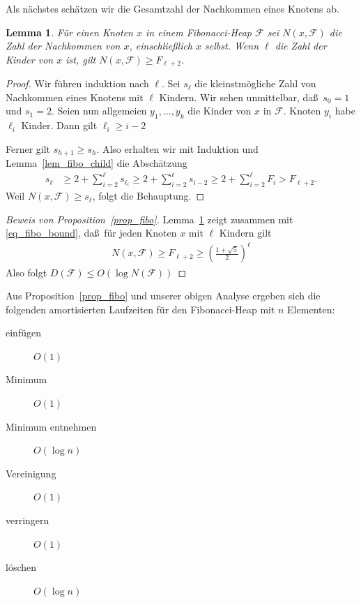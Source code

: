 \documentclass[10pt,reqno]{amsart}
\numberwithin{equation}{section}
\newcommand\cF{\mathcal F}
\newtheorem{lemma}[definition]{Lemma}
\newcommand\bc[1]{\left({#1}\right)}
\newcommand\bcfr[2]{\bc{\frac{#1}{#2}}}
\newcommand\Lem{Lemma}
\newcommand\Prop{Proposition}
\begin{document}
Als n\"achstes sch\"atzen wir die Gesamtzahl der Nachkommen eines Knotens ab.
				
		\begin{lemma}\label{lem_fibo_succ}
			F\"ur einen Knoten $x$ in einem Fibonacci-Heap $\cF$ sei $N(x,\cF)$ die Zahl der Nachkommen von $x$, einschlie\ss lich $x$ selbst. Wenn $\ell$ die Zahl der Kinder von $x$ ist, gilt $ N(x,\cF)\geq F_{\ell+2} $.
		\end{lemma}
		\begin{proof}
				Wir f\"uhren induktion nach $\ell$.
				Sei $s_\ell$ die kleinstm\"ogliche Zahl von Nachkommen eines Knotens mit $\ell$ Kindern.
				Wir sehen unmittelbar, da\ss\ $s_0=1$ und $s_1=2$.
				Seien nun allgemeien $y_1,\ldots,y_k$ die Kinder von $x$ in $\cF$.
				Knoten $y_i$ habe $\ell_i$ Kinder.
				Dann gilt $\ell_i\geq i-2$

				Ferner gilt $s_{h+1}\geq s_h$.
				Also erhalten wir mit Induktion und \Lem~\ref{lem_fibo_child} die Absch\"atzung
					\begin{align*}
						s_\ell&\geq2+\sum_{i=2}^\ell s_{\ell_i}\geq2+\sum_{i=2}^\ell s_{i-2}\geq2+\sum_{i=2}^\ell F_{i}>F_{\ell+2}.
					\end{align*}
				Weil $N(x,\cF)\geq s_\ell$, folgt die Behauptung.
		\end{proof}

		\begin{proof}[Beweis von \Prop~\ref{prop_fibo}]

			Lemma~\ref{lem_fibo_succ} zeigt zusammen mit \eqref{eq_fibo_bound}, da\ss\ f\"ur jeden Knoten $x$ mit $\ell$ Kindern gilt
					\begin{align*}
						N(x,\cF)\geq F_{\ell+2}\geq\bcfr{1+\sqrt 5}2^\ell
					\end{align*}
			Also folgt $D(\cF)\leq O(\log N(\cF))$
		\end{proof}

		Aus \Prop~\ref{prop_fibo} und unserer obigen Analyse ergeben sich die folgenden amortisierten Laufzeiten f\"ur den Fibonacci-Heap mit $n$ Elementen:
			\begin{description}
				\item[einf\"ugen] $O(1)$
				\item[Minimum] $O(1)$
				\item[Minimum entnehmen] $O(\log n)$
				\item[Vereinigung] $O(1)$
				\item[verringern] $O(1)$
				\item[l\"oschen] $O(\log n)$
			\end{description}
\end{document}
